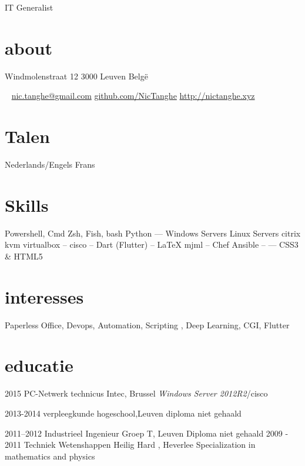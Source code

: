 \documentclass[]{friggeri-cv}
\begin{document}
       {IT Generalist}


\begin{aside}
  \section{about}
    Windmolenstraat 12
    3000 Leuven
    Belgë

    ~
    \href{nic.tanghe@gmail.com}{nic.tanghe@gmail.com}
    \href{https://github.com/NicTanghe}{github.com/NicTanghe}
    \href{http://nictanghe.xyz}{http://nictanghe.xyz}
    \section{Talen}
    Nederlands/Engels
    Frans
    \section{Skills}
    Powershell, Cmd
    Zsh, Fish, bash
    Python 
    ---
    Windows Servers
    Linux Servers
    citrix
    kvm
    virtualbox
    --
    cisco
    --
    Dart
    (Flutter)
    --
    \LaTeX
    mjml
    --
    Chef
    Ansible
    --
     \CC 
    ---
    CSS3 \& HTML5
  \end{aside}

\section{interesses}

Paperless Office, Devops, Automation, Scripting , 
Deep Learning, CGI, Flutter

\section{educatie}

\begin{entrylist}

  \entry
    {2015}
    {PC-Netwerk technicus}
    {Intec, Brussel}
    {\emph {Windows Server 2012R2}/cisco }


  \entry
    {2013-2014}
    {verpleegkunde}
    {hogeschool,Leuven}
    {diploma niet gehaald}

  \entry
    {2011–2012}
    {Industrieel Ingenieur}
    {Groep T, Leuven}
    {Diploma niet gehaald}
  \entry
    {2009 - 2011}
    {Techniek Wetenshappen}
    {Heilig Hard , Heverlee}
    {Specialization in mathematics and physics}
\end{entrylist}
\end{document}
